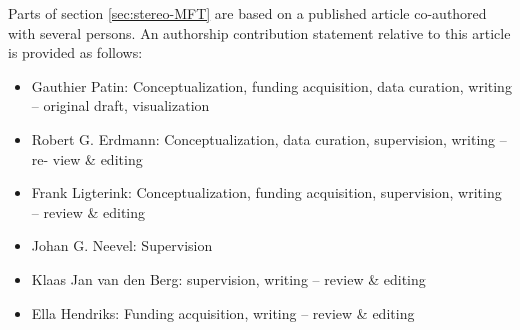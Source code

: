 

Parts of section \ref{sec:stereo-MFT} are based on a published article \citep{patin_enhanced_2022} co-authored with several persons. An authorship contribution statement relative to this article is provided as follows:

\begin{itemize}
\item Gauthier Patin: Conceptualization, funding acquisition, data curation, writing – original draft, visualization

\item Robert G. Erdmann: Conceptualization, data curation, supervision, writing – re-
view \& editing

\item Frank Ligterink: Conceptualization, funding acquisition, supervision, writing – review \& editing

\item Johan G. Neevel: Supervision

\item Klaas Jan van den Berg: supervision, writing – review \& editing

\item Ella Hendriks: Funding acquisition, writing – review \& editing
\end{itemize}